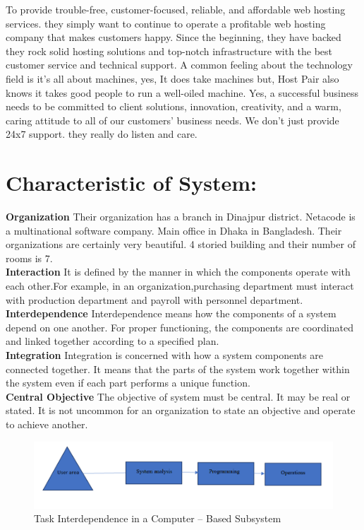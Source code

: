 \documentclass[a4paper,12pt]{report}
\begin{document}
To provide trouble-free, customer-focused, reliable, and affordable web hosting services. they simply want
to continue to operate a profitable web hosting company that makes customers happy. Since the
beginning, they have backed they rock solid hosting solutions and top-notch infrastructure with the best
customer service and technical support. A common feeling about the technology field is it's all about
machines, yes, It does take machines but, Host Pair also knows it takes good people to run a well-oiled
machine. Yes, a successful business needs to be committed to client solutions, innovation, creativity, and
a warm, caring attitude to all of our customers' business needs. We don't just provide 24x7 support. they
really do listen and care.
\section {Characteristic of System:}
\textbf{Organization}
Their organization has a branch in Dinajpur district. Netacode is a multinational software company. Main office in Dhaka in Bangladesh. Their organizations are certainly very beautiful. 4 storied building and their number of rooms is 7.\\

\textbf{Interaction}
It is defined by the manner in which the components operate with each other.For example, in an organization,purchasing department must interact with production department and payroll with personnel department.\\

\textbf{Interdependence}
Interdependence means how the components of a system depend on one another. For proper functioning, the components are coordinated and linked together according to a specified plan. \\

\textbf{Integration}
Integration is concerned with how a system components are connected together. It means that the parts of the system work together within the system even if each part performs a unique function.\\

\textbf{Central Objective}
The objective of system must be central. It may be real or stated. It is not uncommon for an organization to state an objective and operate to achieve another.\\
\begin{figure}[h]
	\centering
	\includegraphics[width=0.7\linewidth]{1}
	\caption{Task Interdependence in a Computer – Based Subsystem }
	\label{fig:1}
\end{figure}
\end{document}
